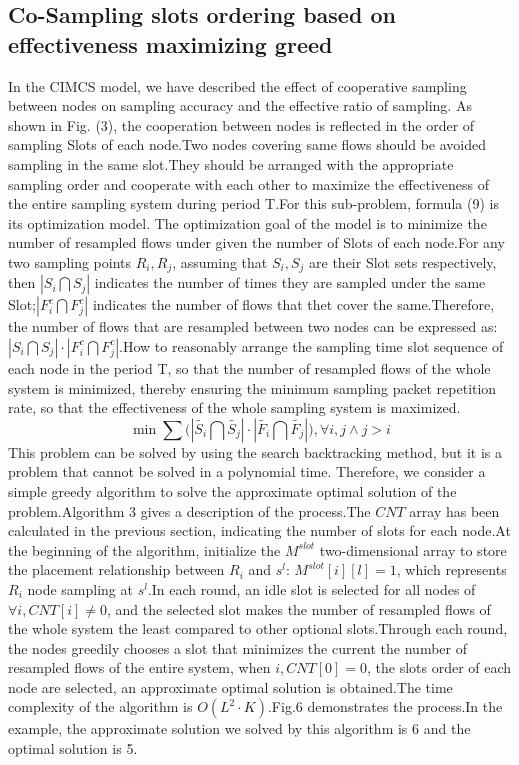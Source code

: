 \documentclass[conference]{IEEEtran}
\begin{document}
\subsection{Co-Sampling slots ordering based on effectiveness maximizing greed}
In the CIMCS model, we have described the effect of cooperative sampling between nodes on sampling accuracy and the effective ratio of sampling. As shown in Fig. (3), the cooperation between nodes is reflected in the order of sampling Slots of each node.Two nodes covering same flows should be avoided sampling in the same slot.They should be arranged with the appropriate sampling order and cooperate with each other to maximize the effectiveness of the entire sampling system during period T.For this sub-problem, formula (9) is its optimization model. The optimization goal of the model is to minimize the number of resampled flows under given the number of Slots of each node.For any two sampling points $R_i, R_j$, assuming that $S_i, S_j$ are their Slot sets respectively, then $|S_i \bigcap S_j|$ indicates the number of times they are sampled under the same Slot;$|F_i^c \bigcap F_j^c|$ indicates the number of flows that thet cover the same.Therefore, the number of flows that are resampled between two nodes can be expressed as: $|S_i \bigcap S_j| \cdot |F_i^c \bigcap F_j^c|$.How to reasonably arrange the sampling time slot sequence of each node in the period T, so that the number of resampled flows of the whole system is minimized, thereby ensuring the minimum sampling packet repetition rate, so that the effectiveness of the whole sampling system is maximized.
\begin{equation}
\min \sum{(\left| \widetilde{{{S}_{i}}}\bigcap \widetilde{{{S}_{j}}} \right|}\cdot \left| \widetilde{{{F}_{i}}}\bigcap \widetilde{{{F}_{j}}} \right|),\forall i,j\wedge j>i
\end{equation}
This problem can be solved by using the search backtracking method, but it is a problem that cannot be solved in a polynomial time. Therefore, we consider a simple greedy algorithm to solve the approximate optimal solution of the problem.Algorithm 3 gives a description of the process.The $CNT$ array has been calculated in the previous section, indicating the number of slots for each node.At the beginning of the algorithm, initialize the $M^{slot}$ two-dimensional array to store the placement relationship between $R_i$ and $s^l$: $M^{slot}[i][l]=1$, which represents $R_i$ node sampling at $s^l$.In each round, an idle slot is selected for all nodes of $\forall i, CNT[i]\neq 0$, and the selected slot makes the number of resampled flows of the whole system the least compared to other optional slots.Through each round, the nodes greedily chooses a slot that minimizes the current the number of resampled flows of the entire system, when $i, CNT[0]=0$, the slots order of each node are selected, an approximate optimal solution is obtained.The time complexity of the algorithm is $O(L^2 \cdot K)$.Fig.6 demonstrates the process.In the example, the approximate solution we solved by this algorithm is 6 and the optimal solution is 5.
\end{document}
